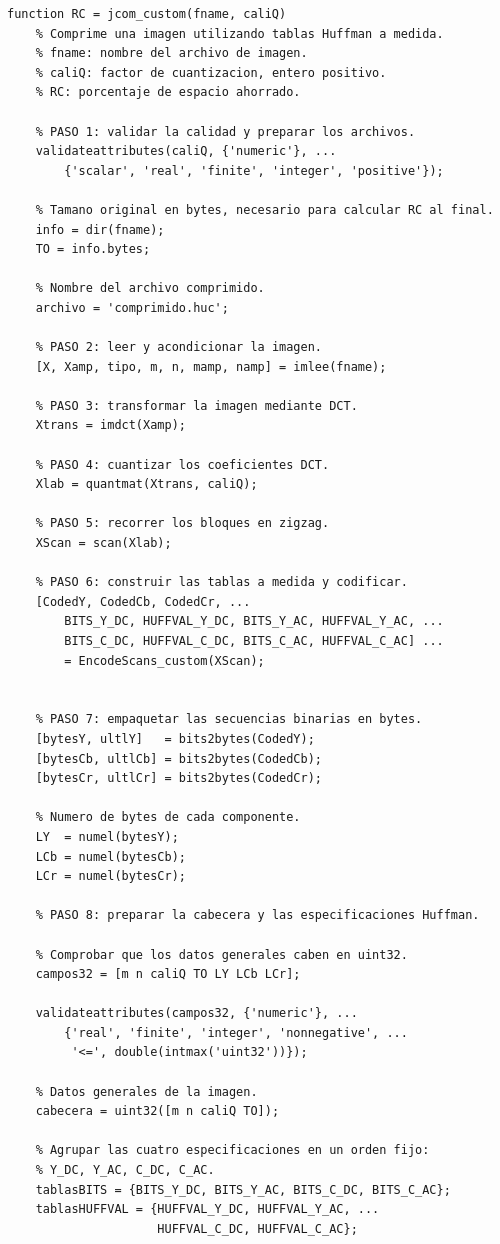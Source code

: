 \documentclass[11pt,a4paper,oneside]{report}
\begin{document}
\begin{lstlisting}
function RC = jcom_custom(fname, caliQ)
    % Comprime una imagen utilizando tablas Huffman a medida.
    % fname: nombre del archivo de imagen.
    % caliQ: factor de cuantizacion, entero positivo.
    % RC: porcentaje de espacio ahorrado.

    % PASO 1: validar la calidad y preparar los archivos.
    validateattributes(caliQ, {'numeric'}, ...
        {'scalar', 'real', 'finite', 'integer', 'positive'});

    % Tamano original en bytes, necesario para calcular RC al final.
    info = dir(fname);
    TO = info.bytes;

    % Nombre del archivo comprimido.
    archivo = 'comprimido.huc';

    % PASO 2: leer y acondicionar la imagen.
    [X, Xamp, tipo, m, n, mamp, namp] = imlee(fname);

    % PASO 3: transformar la imagen mediante DCT.
    Xtrans = imdct(Xamp);

    % PASO 4: cuantizar los coeficientes DCT.
    Xlab = quantmat(Xtrans, caliQ);

    % PASO 5: recorrer los bloques en zigzag.
    XScan = scan(Xlab);

    % PASO 6: construir las tablas a medida y codificar.
    [CodedY, CodedCb, CodedCr, ...
        BITS_Y_DC, HUFFVAL_Y_DC, BITS_Y_AC, HUFFVAL_Y_AC, ...
        BITS_C_DC, HUFFVAL_C_DC, BITS_C_AC, HUFFVAL_C_AC] ...
        = EncodeScans_custom(XScan);


    % PASO 7: empaquetar las secuencias binarias en bytes.
    [bytesY, ultlY]   = bits2bytes(CodedY);
    [bytesCb, ultlCb] = bits2bytes(CodedCb);
    [bytesCr, ultlCr] = bits2bytes(CodedCr);

    % Numero de bytes de cada componente.
    LY  = numel(bytesY);
    LCb = numel(bytesCb);
    LCr = numel(bytesCr);
    
    % PASO 8: preparar la cabecera y las especificaciones Huffman.

    % Comprobar que los datos generales caben en uint32.
    campos32 = [m n caliQ TO LY LCb LCr];

    validateattributes(campos32, {'numeric'}, ...
        {'real', 'finite', 'integer', 'nonnegative', ...
         '<=', double(intmax('uint32'))});

    % Datos generales de la imagen.
    cabecera = uint32([m n caliQ TO]);

    % Agrupar las cuatro especificaciones en un orden fijo:
    % Y_DC, Y_AC, C_DC, C_AC.
    tablasBITS = {BITS_Y_DC, BITS_Y_AC, BITS_C_DC, BITS_C_AC};
    tablasHUFFVAL = {HUFFVAL_Y_DC, HUFFVAL_Y_AC, ...
                     HUFFVAL_C_DC, HUFFVAL_C_AC};


\end{lstlisting}
\end{document}
